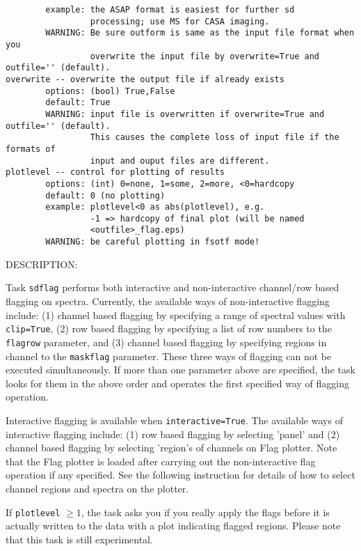 \begin{verbatim}
        example: the ASAP format is easiest for further sd
                 processing; use MS for CASA imaging.
        WARNING: Be sure outform is same as the input file format when you 
                 overwrite the input file by overwrite=True and outfile='' (default).
overwrite -- overwrite the output file if already exists
        options: (bool) True,False
        default: True
        WARNING: input file is overwritten if overwrite=True and outfile='' (default). 
                 This causes the complete loss of input file if the formats of
                 input and ouput files are different.
plotlevel -- control for plotting of results
        options: (int) 0=none, 1=some, 2=more, <0=hardcopy
        default: 0 (no plotting)
        example: plotlevel<0 as abs(plotlevel), e.g.
                 -1 => hardcopy of final plot (will be named
                 <outfile>_flag.eps)
        WARNING: be careful plotting in fsotf mode!

\end{verbatim}


DESCRIPTION:

Task {\tt sdflag} performs both interactive and non-interactive channel/row 
based flagging on spectra.
Currently, the available ways of non-interactive flagging include: 
(1) channel based flagging by specifying a range of spectral values 
with {\tt clip=True}, (2) row based flagging by specifying a list of row 
numbers to the {\tt flagrow} parameter, and (3) channel based flagging by 
specifying regions in channel to the {\tt maskflag} parameter. 
These three ways of flagging can not be executed simultaneously. 
If more than one parameter above are specified, the task looks for 
them in the above order and operates the first specified way of 
flagging operation.

Interactive flagging is available when {\tt interactive=True}. 
The available ways of interactive flagging include: 
(1) row based flagging by selecting 'panel' and (2) channel
based flagging by selecting 'region's of channels on Flag plotter. 
Note that the Flag plotter is loaded after carrying out the 
non-interactive flag operation if any specified. See the following instruction for
details of how to select channel regions and spectra on the plotter.

If {\tt plotlevel} $ \ge 1 $, the task asks you if you really apply the 
flags before it is actually written to the data with a plot 
indicating flagged regions.
Please note that this task is still experimental.

